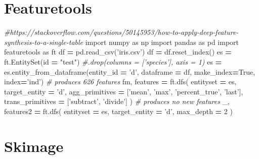 \documentclass[]{book}
\newenvironment{Shaded}{\begin{snugshade}}{\end{snugshade}}
\newcommand{\BuiltInTok}[1]{#1}
\newcommand{\CommentTok}[1]{\textcolor[rgb]{0.56,0.35,0.01}{\textit{#1}}}
\newcommand{\DecValTok}[1]{\textcolor[rgb]{0.00,0.00,0.81}{#1}}
\newcommand{\ImportTok}[1]{#1}
\newcommand{\NormalTok}[1]{#1}
\newcommand{\OperatorTok}[1]{\textcolor[rgb]{0.81,0.36,0.00}{\textbf{#1}}}
\newcommand{\StringTok}[1]{\textcolor[rgb]{0.31,0.60,0.02}{#1}}
\newcommand{\VariableTok}[1]{\textcolor[rgb]{0.00,0.00,0.00}{#1}}
\begin{document}
\hypertarget{featuretools}{%
\section{Featuretools}\label{featuretools}}

\begin{Shaded}
\begin{Highlighting}[]
\CommentTok{#https://stackoverflow.com/questions/50145953/how-to-apply-deep-feature-synthesis-to-a-single-table}
\ImportTok{import}\NormalTok{ numpy }\ImportTok{as}\NormalTok{ np}
\ImportTok{import}\NormalTok{ pandas }\ImportTok{as}\NormalTok{ pd}
\ImportTok{import}\NormalTok{ featuretools }\ImportTok{as}\NormalTok{ ft}
\NormalTok{df }\OperatorTok{=}\NormalTok{ pd.read_csv(}\StringTok{'iris.csv'}\NormalTok{)}
\NormalTok{df }\OperatorTok{=}\NormalTok{ df.reset_index()}
\NormalTok{es }\OperatorTok{=}\NormalTok{ ft.EntitySet(}\BuiltInTok{id} \OperatorTok{=} \StringTok{"test"}\NormalTok{) }\CommentTok{#.drop(columns = ['species'], axis = 1)}
\NormalTok{es }\OperatorTok{=}\NormalTok{ es.entity_from_dataframe(entity_id }\OperatorTok{=} \StringTok{'d'}\NormalTok{, dataframe }\OperatorTok{=}\NormalTok{ df, make_index}\OperatorTok{=}\VariableTok{True}\NormalTok{, index}\OperatorTok{=}\StringTok{'ind'}\NormalTok{)}
\CommentTok{# produces 626 features}
\NormalTok{fm, features }\OperatorTok{=}\NormalTok{ ft.dfs(}
\NormalTok{    entityset }\OperatorTok{=}\NormalTok{ es, }
\NormalTok{    target_entity }\OperatorTok{=} \StringTok{'d'}\NormalTok{,}
\NormalTok{    agg_primitives }\OperatorTok{=}\NormalTok{ [}\StringTok{'mean'}\NormalTok{, }\StringTok{'max'}\NormalTok{, }\StringTok{'percent_true'}\NormalTok{, }\StringTok{'last'}\NormalTok{],}
\NormalTok{    trans_primitives }\OperatorTok{=}\NormalTok{ [}\StringTok{'subtract'}\NormalTok{, }\StringTok{'divide'}\NormalTok{]}
\NormalTok{)}
\CommentTok{# produces no new features}
\NormalTok{_, features2 }\OperatorTok{=}\NormalTok{ ft.dfs(}
\NormalTok{    entityset }\OperatorTok{=}\NormalTok{ es, }
\NormalTok{    target_entity }\OperatorTok{=} \StringTok{'d'}\NormalTok{,}
\NormalTok{    max_depth }\OperatorTok{=} \DecValTok{2}
\NormalTok{)}
\end{Highlighting}
\end{Shaded}

\hypertarget{skimage}{%
\section{Skimage}\label{skimage}}
\end{document}
